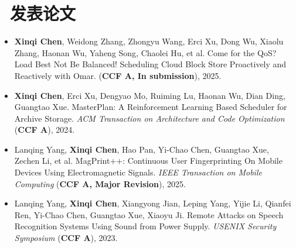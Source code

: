 \documentclass{resume}
\begin{document}
\section{\faFileTextO \ 发表论文}
\begin{itemize}[parsep=0.5ex]
  \item \textbf{Xinqi Chen}, Weidong Zhang, Zhongyu Wang, Erci Xu, Dong Wu, Xiaolu Zhang, Haonan Wu, Yaheng Song, Chaolei Hu, et al. Come for the QoS? Load Best Not Be Balanced! Scheduling Cloud Block Store Proactively and Reactively with
  Omar. (\textbf{CCF A, In submission}), 2025.
  \item \textbf{Xinqi Chen}, Erci Xu, Dengyao Mo, Ruiming Lu, Haonan Wu, Dian Ding, Guangtao Xue. MasterPlan: A Reinforcement Learning Based Scheduler for Archive Storage. \textit{ACM Transaction on Architecture and Code Optimization} (\textbf{CCF A}), 2024.
  \item Lanqing Yang, \textbf{Xinqi Chen}, Hao Pan, Yi-Chao Chen, Guangtao Xue, Zechen Li, et al. MagPrint++: Continuous User Fingerprinting On
  Mobile Devices Using Electromagnetic Signals. \textit{IEEE Transaction on Mobile Computing} (\textbf{CCF A, Major Revision}), 2025.
  \item Lanqing Yang, \textbf{Xinqi Chen}, Xiangyong Jian, Leping Yang, Yijie Li, Qianfei Ren, Yi-Chao Chen, Guangtao Xue, Xiaoyu Ji. Remote Attacks on Speech Recognition Systems Using Sound from Power Supply. \textit{USENIX Security Symposium} (\textbf{CCF A}), 2023.
\end{itemize}



\end{document}
